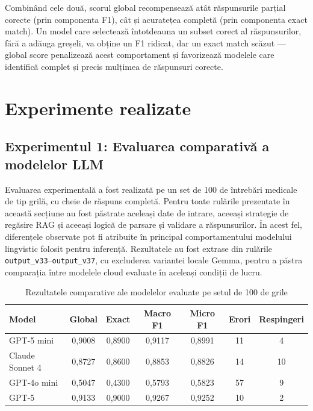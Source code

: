 \documentclass[12pt, a4paper, oneside, romanian]{teza-upb}
\begin{document}
Combinând cele două, scorul global recompensează atât răspunsurile parțial corecte (prin componenta F1), cât și acuratețea completă (prin componenta exact match). Un model care selectează întotdeauna un subset corect al răspunsurilor, fără a adăuga greșeli, va obține un F1 ridicat, dar un exact match scăzut --- global score penalizează acest comportament și favorizează modelele care identifică complet și precis mulțimea de răspunsuri corecte.
\section{Experimente realizate}

\subsection{Experimentul 1: Evaluarea comparativă a modelelor LLM}

Evaluarea experimentală a fost realizată pe un set de 100 de întrebări medicale de tip grilă, cu cheie de răspuns completă. Pentru toate rulările prezentate în această secțiune au fost păstrate aceleași date de intrare, aceeași strategie de regăsire RAG și aceeași logică de parsare și validare a răspunsurilor. În acest fel, diferențele observate pot fi atribuite în principal comportamentului modelului lingvistic folosit pentru inferență. Rezultatele au fost extrase din rulările \texttt{output\_v33}--\texttt{output\_v37}, cu excluderea variantei locale Gemma, pentru a păstra comparația între modelele cloud evaluate în aceleași condiții de lucru.

\begin{table}[H]
\centering
\caption{Rezultatele comparative ale modelelor evaluate pe setul de 100 de grile}
\label{tab:rezultate_benchmark_llm}
\small
\setlength{\tabcolsep}{4pt}
\begin{tabular}{lcccccc}
\toprule
\textbf{Model} & \textbf{Global} & \textbf{Exact} & \textbf{Macro F1} & \textbf{Micro F1} & \textbf{Erori} & \textbf{Respingeri} \\
\midrule
GPT-5 mini & 0,9008 & 0,8900 & 0,9117 & 0,8991 & 11 & 4 \\
Claude Sonnet 4 & 0,8727 & 0,8600 & 0,8853 & 0,8826 & 14 & 10 \\
GPT-4o mini & 0,5047 & 0,4300 & 0,5793 & 0,5823 & 57 & 9 \\
GPT-5 & 0,9133 & 0,9000 & 0,9267 & 0,9252 & 10 & 2 \\
\bottomrule
\end{tabular}
\end{table}
\end{document}
